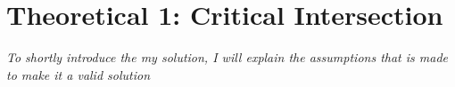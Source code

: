 \documentclass[11pt,a4paper]{article}
\theoremstyle{plain}
\theoremstyle{definition}
\theoremstyle{remark}
\numberwithin{equation}{section}
\begin{document}

\clearpage\maketitle
\thispagestyle{empty}
\clearpage\newpage
\thispagestyle{plain}


\section*{Theoretical 1: Critical Intersection}

\textit{To shortly introduce the my solution, I will explain the assumptions that is made to make it a valid solution}
\end{document}

